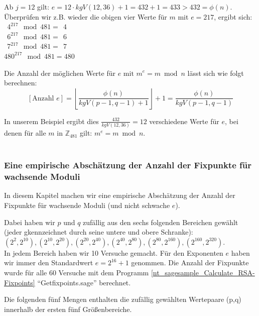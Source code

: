 \begin{refsegment}
 Ab $j=12$ gilt: $ e=12\cdot kgV(12,36)+1=432+1=433 > 432=\phi(n)$.\\

 Überprüfen wir z.B. wieder die obigen vier Werte für $m$ mit $e=217$, ergibt sich:\\
$~~4^{217} \mod 481=~~4 $\\
$~~6^{217} \mod 481=~~6 $\\
$~~7^{217} \mod 481=~~7 $\\
$480^{217} \mod 481=480 $\\

\begin{satz}\label{nt-thm-complete-fixed-point-property-number-of-e}
Die Anzahl der möglichen Werte für $e\text{ mit } m^e = m \bmod n$ lässt sich wie folgt berechnen:
\[\left[ \text{Anzahl }e \right]=\left\lfloor \frac{\phi(n)}{kgV(p-1,q-1)+1}\right\rfloor +1=\frac{\phi(n)}{kgV(p-1,q-1)}
\]
\end{satz}

 In unserem Beispiel ergibt dies $\frac{432}{kgV(12,36)}=12 $ verschiedene Werte
für $e$, bei denen für alle $m$ in $\mathbb{Z}_{481}$ gilt: $m^e = m \bmod n$.\\
~\\ %



\newpage
\subsubsection[Empirische Abschätzung der Anzahl der Fixpunkte für wachsende Moduli]
              {Eine empirische Abschätzung der Anzahl der Fixpunkte für wachsende Moduli}
In diesem Kapitel machen wir eine empirische Abschätzung der Anzahl der Fixpunkte
für wachsende Moduli (und nicht schwache $e$).

 Dabei haben wir $p $ und $ q$ zufällig aus den sechs folgenden Bereichen
gewählt (jeder gkennzeichnet durch seine untere und obere Schranke):\\
$(2^2, 2^{10}), (2^{10}, 2^{20}), (2^{20}, 2^{40}), (2^{40}, 2^{80}),
 (2^{80}, 2^{160}), (2^{160}, 2^{320})$.\\
In jedem Bereich haben wir 10 Versuche gemacht. Für den Exponenten $e$ haben wir
immer den Standardwert $e=2^{16}+1$ genommen. Die Anzahl der Fixpunkte wurde für
alle 60 Versuche mit dem Programm
\ref{nt_sagesample_Calculate_RSA-Fixpoints} "`Getfixpoints.sage"' berechnet.

 Die folgenden fünf Mengen enthalten die zufällig gewählten Wertepaare (p,q) innerhalb
der ersten fünf Größenbereiche.


\end{refsegment}
